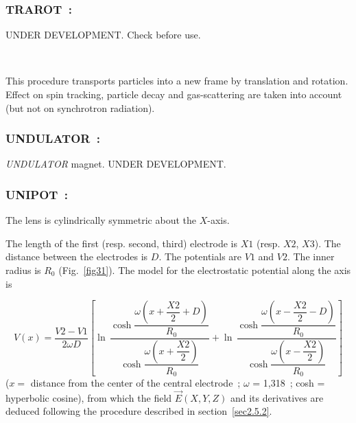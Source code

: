 \newpage

\subsubsection*{TRAROT~: \TRAROTTitl} \label{TRAROT} 
\medskip


UNDER DEVELOPMENT. Check before use. 

~

\noindent  This procedure transports particles into a new frame by translation and rotation. Effect on spin tracking, 
particle decay and gas-scattering are taken into account (but not on synchrotron radiation).





\newpage


\subsubsection*{UNDULATOR~: \UNDULATORTitl}\label{UNDULATOR}  

\medskip


\textsl{UNDULATOR} magnet. UNDER DEVELOPMENT. 



\newpage

\subsubsection*{UNIPOT~: \UNIPOTTitl} \label{UNIPOT} 
\medskip 

The lens is cylindrically symmetric about the $ X$-axis.  
\medskip

\noindent The length of the first (resp. second, third) electrode is $ X1 $
(resp. $ X2$, $X3$). The distance between the electrodes is $ D$.  
The potentials are $ V1 $ and $V2$.  The inner radius is $ R_0 $ (Fig.~\ref{fig31}).  
The model for the electrostatic potential along the axis is~\cite{Biblio19}  %

$$ V(x) = 
    \dfrac{V2-V1 }{ 2\omega D} \left[
    \ln\, \dfrac{\cosh 
    	\dfrac{\omega \left(x+ \dfrac{X2}{ 2}+D \right) }{ R_0} }{
       \cosh \dfrac{\omega \left(x+\dfrac{X2 }{ 2}\right) }{ R_0}}  
    + \ln\,  \dfrac{\cosh \dfrac{\omega \left(x-\dfrac{X2 }{ 2}-D\right) }{R_0} }{
       \cosh \dfrac{\omega \left(x-\dfrac{X2 }{ 2}\right) }{R_0} }
     \right] $$
%
($ x  = $ distance from the center of the central electrode~;
$\omega$  = 1,318~; cosh = hyperbolic cosine), from which the field $ \vec  E(X,Y,Z) $ and its
derivatives are deduced following the procedure described in section~\ref{sec2.5.2}. 

